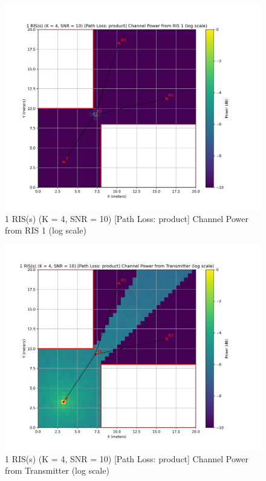 \begin{figure}[H]
  \centering
  \includegraphics[width=0.8\linewidth]{imgs/heatmap-simulations/1 RIS(s) (K = 4, SNR = 10) [Path Loss_ product] Channel Power from RIS 1 (log scale).png}
  \caption{1 RIS(s) (K = 4, SNR = 10) [Path Loss: product] Channel Power from RIS 1 (log scale)}
\end{figure}

\begin{figure}[H]
  \centering
  \includegraphics[width=0.8\linewidth]{imgs/heatmap-simulations/1 RIS(s) (K = 4, SNR = 10) [Path Loss_ product] Channel Power from Transmitter (log scale).png}
  \caption{1 RIS(s) (K = 4, SNR = 10) [Path Loss: product] Channel Power from Transmitter (log scale)}
\end{figure}


